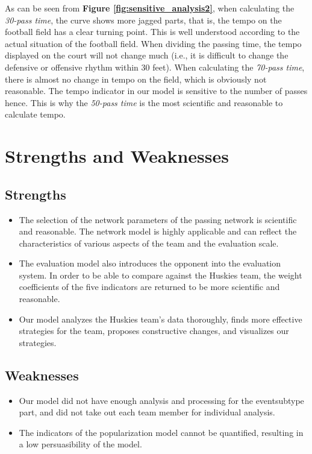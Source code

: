 \documentclass[12pt]{article}  %
\begin{document}
As can be seen from \textbf{Figure \ref{fig:sensitive_analysis2}}, when calculating the \textit{30-pass time}, the curve shows more jagged parts, that is, the tempo on the football field has a clear turning point. This is well understood according to the actual situation of the football field. When dividing the passing time, the tempo displayed on the court will not change much (i.e., it is difficult to change the defensive or offensive rhythm within 30 feet). When calculating the \textit{70-pass time}, there is almost no change in tempo on the field, which is obviously not reasonable. The tempo indicator in our model is sensitive to the number of passes hence. This is why the \textit{50-pass time} is the most scientific and reasonable to calculate tempo.


\section{Strengths and Weaknesses}
\subsection{Strengths}
\begin{itemize}
    \item The selection of the network parameters of the passing network is scientific and reasonable. The network model is highly applicable and can reflect the characteristics of various aspects of the team and the evaluation scale.
    \item The evaluation model also introduces the opponent into the evaluation system. In order to be able to compare against the Huskies team, the weight coefficients of the five indicators are returned to be more scientific and reasonable.
    \item Our model analyzes the Huskies team's data thoroughly, finds more effective strategies for the team, proposes constructive changes, and visualizes our strategies.
\end{itemize}
\subsection{Weaknesses}
\begin{itemize}
    \item Our model did not have enough analysis and processing for the eventsubtype part, and did not take out each team member for individual analysis.
    \item The indicators of the popularization model cannot be quantified, resulting in a low persuasibility of the model.
  \end{itemize}
\end{document}

